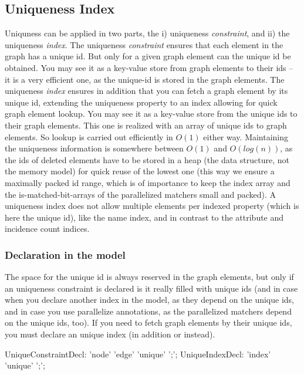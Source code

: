 \subsection{Uniqueness Index}\label{sec:uniqueness}
Uniquness can be applied in two parts, the i) uniqueness \emph{constraint}, and ii) the uniqueness \emph{index}.
The uniqueness \emph{constraint} ensures that each element in the graph has a unique id. 
But only for a given graph element can the unique id be obtained.
You may see it as a key-value store from graph elements to their ids -- it is a very efficient one, as the unique-id is stored in the graph elements. 
The uniqueness \emph{index} ensures in addition that you can fetch a graph element by its unique id, extending the uniqueness property to an index allowing for quick graph element lookup.
You may see it as a key-value store from the unique ids to their graph elements.
This one is realized with an array of unique ids to graph elements.
So lookup is carried out efficiently in $O(1)$ either way.
Maintaining the uniqueness information is somewhere between $O(1)$ and $O(log(n))$, as the ids of deleted elements have to be stored in a heap (the data structure, not the memory model) for quick reuse of the lowest one (this way we ensure a maximally packed id range, which is of importance to keep the index array and the is-matched-bit-arrays of the parallelized matchers small and packed).
A uniqueness index does not allow multiple elements per indexed property (which is here the unique id), like the name index, and in contrast to the attribute and incidence count indices.

\subsubsection*{Declaration in the model}
The space for the unique id is always reserved in the graph elements, but only if an uniqueness constraint is declared is it really filled with unique ids (and in case when you declare another index in the model, as they depend on the unique ids, and in case you use parallelize annotations, as the parallelized matchers depend on the unique ids, too).
If you need to fetch graph elements by their unique ids, you must declare an unique index (in addition or instead).

\begin{rail}
  UniqueConstraintDecl: 'node' 'edge' 'unique' ';';
  UniqueIndexDecl: 'index' 'unique' ';';
\end{rail}


